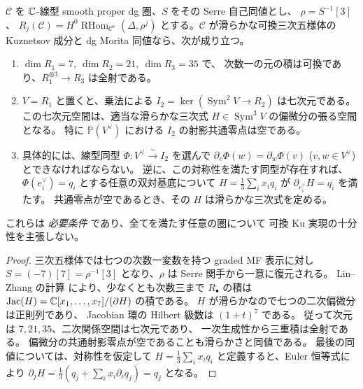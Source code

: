 \begin{proposition}
\label{nft:prop:jacobian-necessary}
$\mathcal C$ を $\mathbb C$-線型 smooth proper dg 圏、$S$ をその Serre 自己同値とし、
$\rho=S^{-1}[3]$、
$R_j(\mathcal C)=H^0\operatorname{RHom}_{\mathcal C^e}(\Delta,\rho^j)$
とする。$\mathcal C$ が滑らかな可換三次五様体の Kuznetsov 成分と
dg Morita 同値なら、次が成り立つ。
\begin{enumerate}
\item $\dim R_1=7,\ \dim R_2=21,\ \dim R_3=35$ で、
次数一の元の積は可換であり、$R_1^{\otimes3}\to R_3$ は全射である。
\item $V=R_1$ と置くと、乗法による
$I_2=\ker(\operatorname{Sym}^2 V\to R_2)$ は七次元である。
この七次元空間は、適当な滑らかな三次式
$H\in\operatorname{Sym}^3V$ の偏微分の張る空間となる。
特に $\mathbb P(V^\vee)$ における $I_2$ の射影共通零点は空である。
\item 具体的には、線型同型
$\Phi:V^\vee\xrightarrow{\sim}I_2$ を選んで
$\partial_v\Phi(w)=\partial_w\Phi(v)$
($v,w\in V^\vee$) とできなければならない。
逆に、この対称性を満たす同型が存在すれば、
$\Phi(e_i^\vee)=q_i$ とする任意の双対基底について
$H=\frac13\sum_i x_iq_i$ が $\partial_{e_i^\vee}H=q_i$ を満たす。
共通零点が空であるとき、その $H$ は滑らかな三次式を定める。
\end{enumerate}
これらは \emph{必要条件} であり、全てを満たす任意の圏について
可換 Ku 実現の十分性を主張しない。
\end{proposition}
\begin{proof}
三次五様体では七つの次数一変数を持つ graded MF 表示に対し
$S=(-7)[7]=\rho^{-1}[3]$ となり、$\rho$ は Serre 関手から一意に復元される。
Lin--Zhang の計算
\cite[Theorem~3.5, Remark~3.6, Proposition~3.7]{LZ}
により、少なくとも次数三まで $R_\bullet$ の積は
$\operatorname{Jac}(H)=\mathbb C[x_1,\ldots,x_7]/(\partial H)$ の積である。
$H$ が滑らかなので七つの二次偏微分は正則列であり、
Jacobian 環の Hilbert 級数は $(1+t)^7$ である。
従って次元は $7,21,35$、二次関係空間は七次元であり、
一次生成性から三重積は全射である。
偏微分の共通射影零点が空であることも滑らかさと同値である。
最後の同値については、対称性を仮定して
$H=\frac13\sum_i x_iq_i$ と定義すると、Euler 恒等式により
$\partial_jH=\frac13(q_j+\sum_i x_i\partial_iq_j)=q_j$ となる。
\end{proof}

